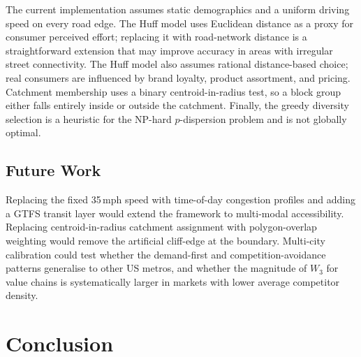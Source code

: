\documentclass[conference]{IEEEtran}
\begin{document}
The current implementation assumes static demographics and a uniform
driving speed on every road edge. The Huff model uses Euclidean
distance as a proxy for consumer perceived effort; replacing it with
road-network distance is a straightforward extension that may improve
accuracy in areas with irregular street connectivity. The Huff model
also assumes rational distance-based choice; real consumers are
influenced by brand loyalty, product assortment, and pricing.
Catchment membership uses a binary centroid-in-radius test, so a
block group either falls entirely inside or outside the catchment.
Finally, the greedy diversity selection is a heuristic for the NP-hard
$p$-dispersion problem and is not globally optimal.

\subsection{Future Work}

Replacing the fixed 35\,mph speed with time-of-day congestion
profiles and adding a GTFS transit layer would extend the framework
to multi-modal accessibility. Replacing centroid-in-radius catchment
assignment with polygon-overlap weighting would remove the artificial
cliff-edge at the boundary. Multi-city calibration could test whether
the demand-first and competition-avoidance patterns generalise to other
US metros, and whether the magnitude of $W_3$ for value chains is
systematically larger in markets with lower average competitor density.

\section{Conclusion}
\end{document}

